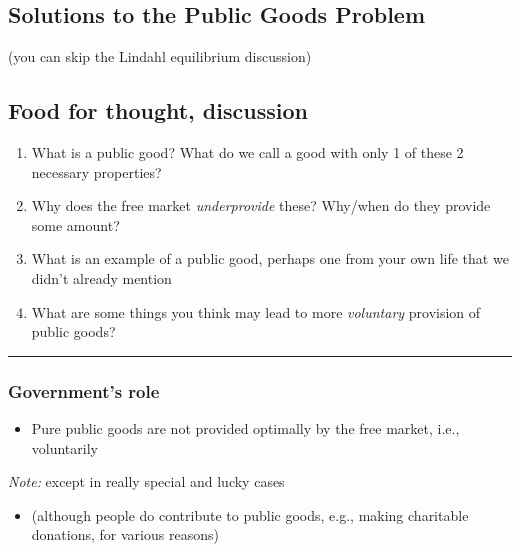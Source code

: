 \documentclass[]{article}
\providecommand{\tightlist}{%
  \setlength{\itemsep}{0pt}\setlength{\parskip}{0pt}}
\begin{document}
\hypertarget{solutions-to-the-public-goods-problem}{%
\subsection{Solutions to the Public Goods Problem}\label{solutions-to-the-public-goods-problem}}

(you can skip the Lindahl equilibrium discussion)

\hypertarget{food-for-thought-discussion}{%
\subsection{Food for thought, discussion}\label{food-for-thought-discussion}}

\begin{enumerate}
\def\labelenumi{\arabic{enumi}.}
\item
  What is a public good? What do we call a good with only 1 of these 2 necessary properties?
\item
  Why does the free market \emph{underprovide} these? Why/when do they provide some amount?
\item
  What is an example of a public good, perhaps one from your own life that we didn't already mention
\item
  What are some things you think may lead to more \emph{voluntary} provision of public goods?
\end{enumerate}

\begin{center}\rule{0.5\linewidth}{\linethickness}\end{center}

\hypertarget{governments-role}{%
\subsubsection{Government's role}\label{governments-role}}

\begin{itemize}
\tightlist
\item
  Pure public goods are not provided optimally by the free market, i.e., voluntarily
\end{itemize}

\emph{Note:} except in really special and lucky cases

\begin{itemize}
\tightlist
\item
  (although people do contribute to public goods, e.g., making charitable donations, for various reasons)
\end{itemize}
\end{document}
